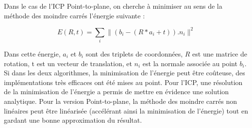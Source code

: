 Dans le cas de l'ICP Point-to-plane, on cherche à minimiser au sens de la méthode des moindre carrés l'énergie suivante :

\begin{equation}
E(R,t) = \sum_{i} \|(b_{i}-(R*a_{i} + t)).n_{i}\|^{2}
\end{equation}	

Dans cette énergie, $a_{i}$ et $b_{i}$ sont des triplets de coordonnées, $R$ est une matrice de rotation, t est un vecteur de translation, et $n_{i}$ est la normale associée au point $b_{i}$.\\

Si dans les deux algorithmes, la minimisation de l'énergie peut être coûteuse, des implémentations très efficaces ont été mises au point. Pour l'ICP, une résolution de la minimisation de l'énergie a permis de mettre en évidence une solution analytique. Pour la version Point-to-plane, la méthode des moindre carrés non linéaires peut être linéarisée (accélérant ainsi la minimisation de l'énergie) tout en gardant une bonne approximation du résultat.
